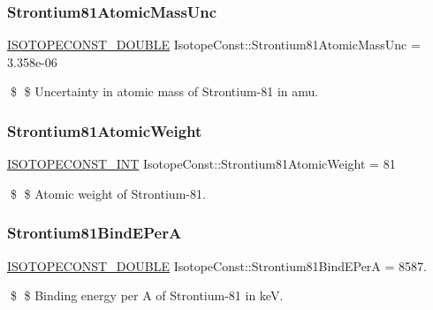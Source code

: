 \subsubsection{\texorpdfstring{Strontium81\+Atomic\+Mass\+Unc}{Strontium81AtomicMassUnc}}
{\footnotesize\ttfamily \mbox{\hyperlink{group___isotope_const-_macros_ga8f45a7272ce02c0b4c65c44636ed719a}{I\+S\+O\+T\+O\+P\+E\+C\+O\+N\+S\+T\+\_\+\+D\+O\+U\+B\+LE}} Isotope\+Const\+::\+Strontium81\+Atomic\+Mass\+Unc = 3.\+358e-\/06}

\$ \$ Uncertainty in atomic mass of Strontium-\/81 in amu. \mbox{\label{group___isotope_const-_strontium-_sr81_ga299cb670586ca03c7101435f5d2008b0}} 
\subsubsection{\texorpdfstring{Strontium81\+Atomic\+Weight}{Strontium81AtomicWeight}}
{\footnotesize\ttfamily \mbox{\hyperlink{group___isotope_const-_macros_ga5f18360b3e99483a35c32d789e62621c}{I\+S\+O\+T\+O\+P\+E\+C\+O\+N\+S\+T\+\_\+\+I\+NT}} Isotope\+Const\+::\+Strontium81\+Atomic\+Weight = 81}

\$ \$ Atomic weight of Strontium-\/81. \mbox{\label{group___isotope_const-_strontium-_sr81_ga08fb740cba090e88318cadc3930fb3a7}} 
\subsubsection{\texorpdfstring{Strontium81\+Bind\+E\+PerA}{Strontium81BindEPerA}}
{\footnotesize\ttfamily \mbox{\hyperlink{group___isotope_const-_macros_ga8f45a7272ce02c0b4c65c44636ed719a}{I\+S\+O\+T\+O\+P\+E\+C\+O\+N\+S\+T\+\_\+\+D\+O\+U\+B\+LE}} Isotope\+Const\+::\+Strontium81\+Bind\+E\+PerA = 8587.}

\$ \$ Binding energy per A of Strontium-\/81 in keV. \mbox{\label{group___isotope_const-_strontium-_sr81_ga1c41b863261ceeebcc20d7ef73fae4ab}} 
